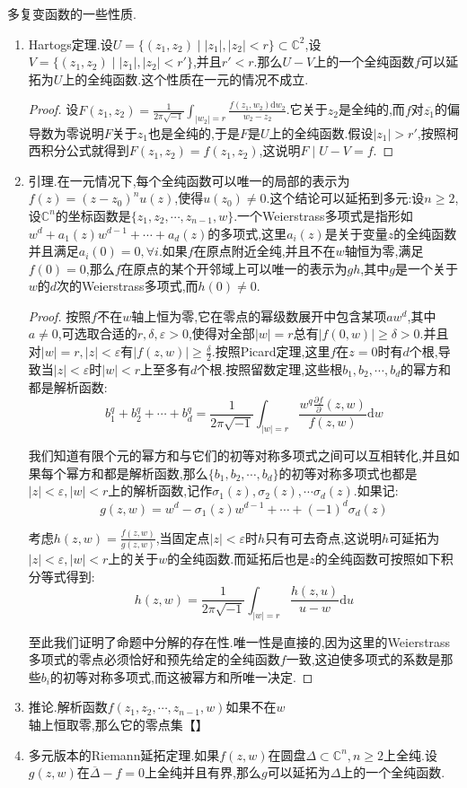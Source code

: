 多复变函数的一些性质.
\begin{enumerate}
	\item Hartogs定理.设$U=\{(z_1,z_2)\mid|z_1|,|z_2|<r\}\subset\mathbb{C}^2$,设$V=\{(z_1,z_2)\mid|z_1|,|z_2|<r'\}$,并且$r'<r$.那么$U-V$上的一个全纯函数$f$可以延拓为$U$上的全纯函数.这个性质在一元的情况不成立.
	\begin{proof}
		
		设$F(z_1,z_2)=\frac{1}{2\pi\sqrt{-1}}\int_{|w_2|=r}\frac{f(z_1,w_2)\mathrm{d}w_2}{w_2-z_2}$.它关于$z_2$是全纯的,而$f$对$\overline{z_1}$的偏导数为零说明$F$关于$z_1$也是全纯的,于是$F$是$U$上的全纯函数.假设$|z_1|>r'$,按照柯西积分公式就得到$F(z_1,z_2)=f(z_1,z_2)$,这说明$F\mid U-V=f$.
	\end{proof}
	
	\item 引理.在一元情况下,每个全纯函数可以唯一的局部的表示为$f(z)=(z-z_0)^nu(z)$,使得$u(z_0)\not=0$.这个结论可以延拓到多元:设$n\ge2$,设$\mathbb{C}^n$的坐标函数是$\{z_1,z_2,\cdots,z_{n-1},w\}$.一个Weierstrass多项式是指形如$w^d+a_1(z)w^{d-1}+\cdots+a_d(z)$的多项式,这里$a_i(z)$是关于变量$z$的全纯函数并且满足$a_i(0)=0,\forall i$.如果$f$在原点附近全纯,并且不在$w$轴恒为零,满足$f(0)=0$,那么$f$在原点的某个开邻域上可以唯一的表示为$gh$,其中$g$是一个关于$w$的$d$次的Weierstrass多项式,而$h(0)\not=0$.
	\begin{proof}
		
		按照$f$不在$w$轴上恒为零,它在零点的幂级数展开中包含某项$aw^d$,其中$a\not=0$,可选取合适的$r,\delta,\varepsilon>0$,使得对全部$|w|=r$总有$|f(0,w)|\ge\delta>0$.并且对$|w|=r,|z|<\varepsilon$有$|f(z,w)|\ge\frac{\delta}{2}$.按照Picard定理,这里$f$在$z=0$时有$d$个根,导致当$|z|<\varepsilon$时$|w|<r$上至多有$d$个根.按照留数定理,这些根$b_1,b_2,\cdots,b_d$的幂方和都是解析函数:
		$$b_1^q+b_2^q+\cdots+b_d^q=\frac{1}{2\pi\sqrt{-1}}\int_{|w|=r}\frac{w^q\frac{\partial f}{\partial}(z,w)}{f(z,w)}\mathrm{d}w$$
		
		我们知道有限个元的幂方和与它们的初等对称多项式之间可以互相转化,并且如果每个幂方和都是解析函数,那么$\{b_1,b_2,\cdots,b_d\}$的初等对称多项式也都是$|z|<\varepsilon,|w|<r$上的解析函数,记作$\sigma_1(z),\sigma_2(z),\cdots\sigma_d(z)$.如果记:
		$$g(z,w)=w^d-\sigma_1(z)w^{d-1}+\cdots+(-1)^d\sigma_d(z)$$
		
		考虑$h(z,w)=\frac{f(z,w)}{g(z,w)}$,当固定点$|z|<\varepsilon$时$h$只有可去奇点,这说明$h$可延拓为$|z|<\varepsilon,|w|<r$上的关于$w$的全纯函数.而延拓后也是$z$的全纯函数可按照如下积分等式得到:
		$$h(z,w)=\frac{1}{2\pi\sqrt{-1}}\int_{|w|=r}\frac{h(z,u)}{u-w}\mathrm{d}u$$
		
		至此我们证明了命题中分解的存在性.唯一性是直接的,因为这里的Weierstrass多项式的零点必须恰好和预先给定的全纯函数$f$一致,这迫使多项式的系数是那些$b_i$的初等对称多项式,而这被幂方和所唯一决定.
	\end{proof}
	\item 推论.解析函数$f(z_1,z_2,\cdots,z_{n-1},w)$如果不在$w$轴上恒取零,那么它的零点集【】
	\item 多元版本的Riemann延拓定理.如果$f(z,w)$在圆盘$\Delta\subset\mathbb{C}^n,n\ge2$上全纯.设$g(z,w)$在$\overline{\Delta}-{f=0}$上全纯并且有界,那么$g$可以延拓为$\Delta$上的一个全纯函数.
\end{enumerate}

